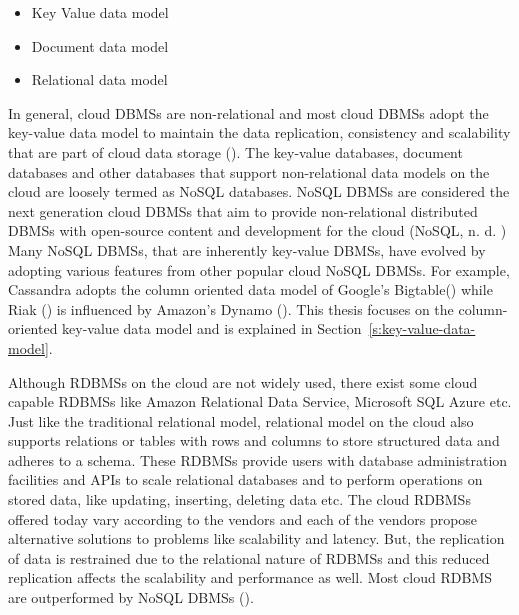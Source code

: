 \begin{itemize}
\item Key Value data model 

\item Document data model 

\item Relational data model
\end{itemize}

In general,   cloud \acp{DBMS} are non-relational and most cloud \acp{DBMS}
adopt the key-value data model to maintain the data replication,   consistency
and scalability that are part of cloud data storage (). The
key-value databases,   document databases and other databases that support
non-relational data models on the cloud are loosely termed as \ac{NoSQL}
databases.  \ac{NoSQL} \acp{DBMS} are considered the next generation cloud
\acp{DBMS} that aim to provide non-relational distributed \acp{DBMS} with
open-source content and development for the cloud (\ac{NoSQL},   n. d. ) Many
\ac{NoSQL} \acp{DBMS},   that are inherently key-value \acp{DBMS},   have
evolved by adopting various features from other popular cloud \ac{NoSQL}
\acp{DBMS}.  For example,   Cassandra adopts the column oriented data model of
Google's Bigtable() while Riak () is influenced by
Amazon's Dynamo ().  This thesis focuses on the column-oriented
key-value data model and is explained in Section~\ref{s:key-value-data-model}.

Although \acp{RDBMS} on the cloud are not widely used,   there exist some cloud
capable \acp{RDBMS} like Amazon Relational Data Service,   Microsoft SQL Azure
etc.  Just like the traditional relational model,   relational model on the
cloud also supports relations or tables with rows and columns to store
structured data and adheres to a schema.  These \acp{RDBMS} provide users with
database administration facilities and APIs to scale relational databases and to
perform operations on stored data,   like updating,   inserting,   deleting data
etc.  The cloud \acp{RDBMS} offered today vary according to the vendors and each
of the vendors propose alternative solutions to problems like scalability and
latency.  But,   the replication of data is restrained due to the relational
nature of \acp{RDBMS} and this reduced replication affects the scalability and
performance as well.  Most cloud \ac{RDBMS} are outperformed by \ac{NoSQL}
\acp{DBMS} ().




